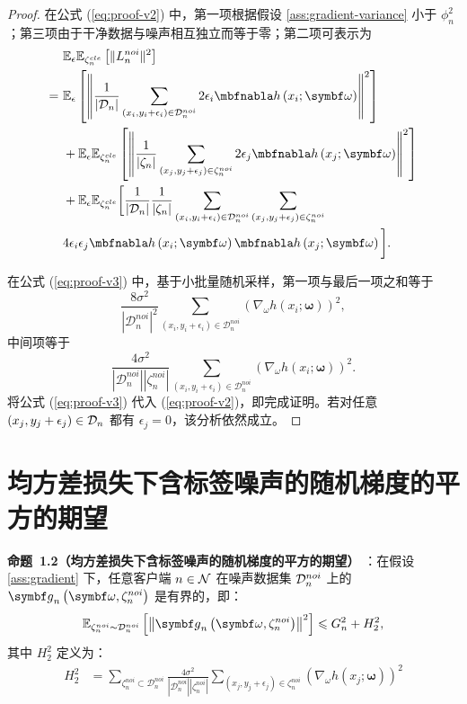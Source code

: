 \begin{proof}
在公式 (\ref{eq:proof-v2}) 中，第一项根据假设 \ref{ass:gradient-variance} 小于 $\phi^2_n$；第三项由于干净数据与噪声相互独立而等于零；第二项可表示为
\begin{align}\label{eq:proof-v3}
   &\mathbb{E}_\epsilon\mathbb{E}_{\zetacle_n}\left[\Vert L_n^{noi}\Vert^2\right] \notag \\
    =~&\mathbb{E}_\epsilon\left[\left\Vert \frac{1}{|\D_n|}\sum_{\left(x_i,y_i+\epsilon_i\right)\in \Dnoi_n}2\epsilon_i\nabla h\left(x_i;\omegab\right)\right\Vert^2\right]\notag \\
    &+\mathbb{E}_\epsilon\mathbb{E}_{\zetacle_n}\left[\left\Vert\frac{1}{|\zeta_n|}\sum_{\left(x_{j},y_j+\epsilon_j\right)\in \zetanoi_n}2\epsilon_j\nabla h\left(x_j;\omegab\right)\right\Vert^2\right]\notag \\
    &+\mathbb{E}_\epsilon\mathbb{E}_{\zetacle_n}\biggl[ \frac{1}{|\D_n|}\frac{1}{|\zeta_n|}\sum_{\left(x_i,y_i+\epsilon_i\right)\in \Dnoi_n}\sum_{\left(x_j,y_j+\epsilon_j\right)\in \zetanoi_n}\notag \\
    &4\epsilon_i\epsilon_j\nabla h\left(x_i;\omegab\right)\nabla h\left(x_j;\omegab\right)\biggl].
\end{align}

在公式 (\ref{eq:proof-v3}) 中，基于小批量随机采样，第一项与最后一项之和等于
$$
\frac{8\sigma^2}{|\mathcal{D}_n^{noi}|^2}\sum_{\left(x_{i},y_{i}+\epsilon_{i}\right)\in \mathcal{D}_n^{noi}}\left(\nabla_\omega  h\left(x_{i};\boldsymbol{\omega}\right)\right)^2,
$$
中间项等于
$$
\frac{4\sigma^2}{|\mathcal{D}_n^{noi}||\zeta_n^{noi}|}\sum_{\left(x_{i},y_{i}+\epsilon_{i}\right)\in \mathcal{D}_n^{noi}}\left(\nabla_\omega  h\left(x_{i};\boldsymbol{\omega}\right)\right)^2.
$$
将公式 (\ref{eq:proof-v3}) 代入 (\ref{eq:proof-v2})，即完成证明。若对任意 $\left(x_j,y_j+\epsilon_j\right)\in\mathcal{D}_n$ 都有 $\epsilon_j=0$，该分析依然成立。
\end{proof}
\section{均方差损失下含标签噪声的随机梯度的平方的期望}\label{app:pro2}
\noindent \textbf{命题~1.2（均方差损失下含标签噪声的随机梯度的平方的期望）}
：在假设 \ref{ass:gradient} 下，任意客户端 $n\in\mathcal{N}$ 在噪声数据集 $\mathcal{D}^{noi}_n$ 上的 $\gb_n\left(\omegab,\zetanoi_n\right)$ 是有界的，即：
\begin{equation}
    \mathbb{E}_{\zetanoi_n\sim \Dnoi_n}\left[\left\Vert \gb_n\left(\omegab, \zetanoi_n\right) \right\Vert^2\right] \leq G_n^2 + H_2^2,
\end{equation}
其中 $H_2^2$ 定义为：
\begin{align}\label{eq:H}
    H_2^2 &= \sum_{\zeta_n^{noi}\subset\mathcal{D}_n^{noi}} \frac{4\sigma^2}{|\mathcal{D}_n^{noi}||\zeta_n^{noi}|}\sum_{\left(x_{j},y_{j}+\epsilon_{j}\right)\in \zeta_n^{noi}}\left(
\nabla_\omega  h\left(x_{j};\boldsymbol{\omega}\right)\right)^2
\tag{}
\end{align}

